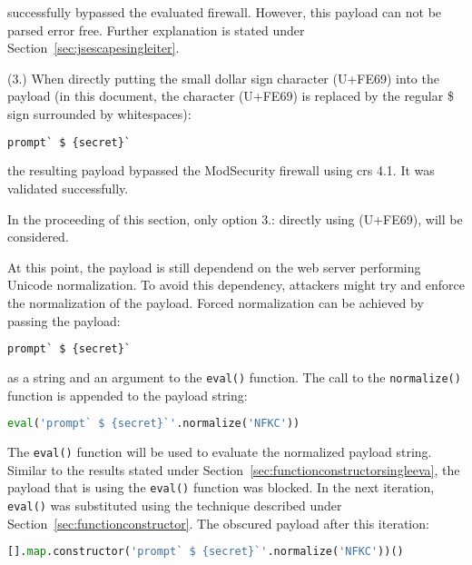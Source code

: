 successfully bypassed the evaluated firewall. However, this payload can not be parsed error free. Further explanation is stated under Section~\ref{sec:jsescapesingleiter}.

(3.) When directly putting the small dollar sign character (U+FE69) into the payload (in this document, the character (U+FE69) is replaced by the regular \$ sign surrounded by whitespaces):

\begin{lstlisting}[style=basicStyle, language=Python]
prompt` $ {secret}`
\end{lstlisting}

the resulting payload bypassed the ModSecurity firewall using \acrshort{crs} 4.1. It was validated successfully.

In the proceeding of this section, only option 3.: directly using (U+FE69), will be considered. 

At this point, the payload is still dependend on the web server performing Unicode normalization. To avoid this dependency, attackers might try and enforce the normalization of the payload. Forced normalization can be achieved by passing the payload:

\begin{lstlisting}[style=basicStyle, language=Python]
prompt` $ {secret}`
\end{lstlisting}

as a string and an argument to the \verb|eval()| function. The call to the \verb|normalize()| function is appended to the payload string:

\begin{lstlisting}[style=basicStyle, language=Python]
eval('prompt` $ {secret}`'.normalize('NFKC'))
\end{lstlisting}

The \verb|eval()| function will be used to evaluate the normalized payload string. Similar to the results stated under Section~\ref{sec:functionconstructorsingleeva}, the payload that is using the \verb|eval()| function was blocked. In the next iteration, \verb|eval()| was substituted using the technique described under Section~\ref{sec:functionconstructor}. The obscured payload after this iteration:

\begin{lstlisting}[style=basicStyle, language=Python, caption=forced unicode normalization bypass, label={lst:forcedunicodenormbypass}]
[].map.constructor('prompt` $ {secret}`'.normalize('NFKC'))()
\end{lstlisting}

